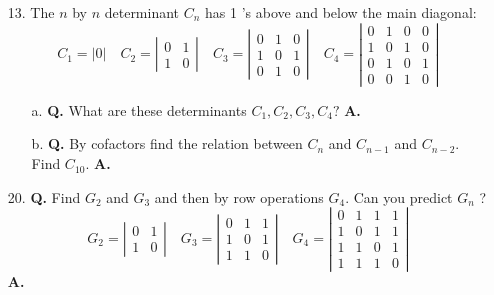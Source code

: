 \documentclass[main.tex]{subfiles}
\begin{document}
\begin{enumerate}
    \item [13.] The $n$ by $n$ determinant $C_{n}$ has 1 's above and below the main diagonal:
    $$
    C_{1}=|0| \quad C_{2}=\left|\begin{array}{ll}
    0 & 1 \\
    1 & 0
    \end{array}\right| \quad C_{3}=\left|\begin{array}{lll}
    0 & 1 & 0 \\
    1 & 0 & 1 \\
    0 & 1 & 0
    \end{array}\right| \quad C_{4}=\left|\begin{array}{llll}
    0 & 1 & 0 & 0 \\
    1 & 0 & 1 & 0 \\
    0 & 1 & 0 & 1 \\
    0 & 0 & 1 & 0
    \end{array}\right|
    $$
    \begin{enumerate}
        \item [a.] \textbf{Q.} What are these determinants $C_{1}, C_{2}, C_{3}, C_{4} ?$ \textbf{A.}
        
        \item [b.] \textbf{Q.} By cofactors find the relation between $C_{n}$ and $C_{n-1}$ and $C_{n-2}$. Find $C_{10}$. \textbf{A.}
        
    \end{enumerate}
    
    \item [20.] \textbf{Q.} Find $G_{2}$ and $G_{3}$ and then by row operations $G_{4}$. Can you predict $G_{n}$ ?
    $$
    G_{2}=\left|\begin{array}{ll}
    0 & 1 \\
    1 & 0
    \end{array}\right| \quad G_{3}=\left|\begin{array}{lll}
    0 & 1 & 1 \\
    1 & 0 & 1 \\
    1 & 1 & 0
    \end{array}\right| \quad G_{4}=\left|\begin{array}{llll}
    0 & 1 & 1 & 1 \\
    1 & 0 & 1 & 1 \\
    1 & 1 & 0 & 1 \\
    1 & 1 & 1 & 0
    \end{array}\right|
    $$
    \textbf{A.}
    
\end{enumerate}
\end{document}
